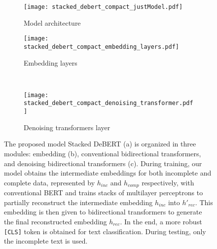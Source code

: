 \documentclass[review]{elsarticle}
\begin{document}
\begin{figure}[ht!]
\centering
\begin{subfigure}[t!]{.85\textwidth}
\texttt{[image: stacked\_debert\_compact\_justModel.pdf]}
\caption{Model architecture}\label{fig:proposed_model_architecture}
\end{subfigure}
\begin{subfigure}[t!]{.41\textwidth}
\texttt{[image: stacked\_debert\_compact\_embedding\_layers.pdf]}
\caption{Embedding layers}\label{fig:embedding_layers}
\end{subfigure}
~
\begin{subfigure}[t!]{.44\textwidth}
\texttt{[image: stacked\_debert\_compact\_denoising\_transformer.pdf]}
\caption{Denoising transformers layer}\label{fig:denoising_transformers}
\end{subfigure}
\caption{The proposed model Stacked DeBERT (a) is organized in three modules: embedding (b), conventional bidirectional transformers, and denoising bidirectional transformers (c). During training, our model obtains the intermediate embeddings for both incomplete and complete data, represented by $h_{inc}$ and $h_{comp}$ respectively, with conventional BERT and trains stacks of multilayer perceptrons to partially reconstruct the intermediate embedding $h_{inc}$ into $h'_{rec}$. This embedding is then given to bidirectional transformers to generate the final reconstructed embedding $h_{rec}$. In the end, a more robust \texttt{[CLS]} token is obtained for text classification. During testing, only the incomplete text is used.} \label{fig:proposed_model}
\end{figure}
\end{document}
